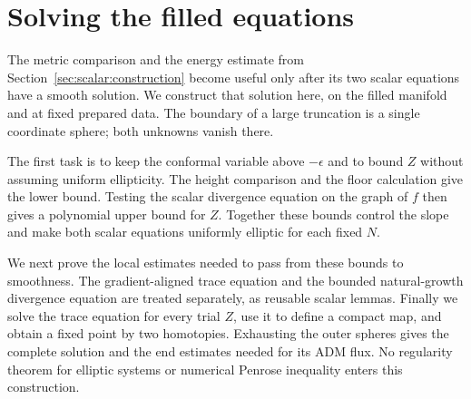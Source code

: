 \section{Solving the filled equations}
\label{sec:elliptic:construction}
\label{sec:elliptic}

The metric comparison and the energy estimate from
Section~\ref{sec:scalar:construction} become useful only after its two
scalar equations have a smooth solution.  We construct that solution
here, on the filled manifold and at fixed prepared data.  The boundary
of a large truncation is a single coordinate sphere; both unknowns
vanish there.

The first task is to keep the conformal variable above $-\epsilon$ and
to bound $Z$ without assuming uniform ellipticity.  The height comparison
and the floor calculation give the lower bound.  Testing the scalar
divergence equation on the graph of $f$ then gives a polynomial upper
bound for $Z$.  Together these bounds control the slope and make both
scalar equations uniformly elliptic for each fixed $N$.

We next prove the local estimates needed to pass from these bounds to
smoothness.  The gradient-aligned trace equation and the bounded
natural-growth divergence equation are treated separately, as reusable
scalar lemmas.  Finally we solve the trace equation for every trial
$Z$, use it to define a compact map, and obtain a fixed point by two
homotopies.  Exhausting the outer spheres gives the complete solution
and the end estimates needed for its ADM flux.  No regularity theorem
for elliptic systems or numerical Penrose inequality enters this
construction.

